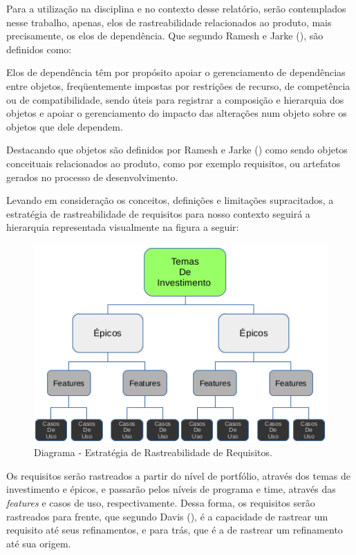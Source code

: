     Para a utilização na disciplina e no contexto desse relatório, 
    serão contemplados nesse trabalho, apenas, elos de rastreabilidade relacionados ao produto, 
    mais precisamente, os elos de dependência. Que segundo Ramesh e Jarke (\citeyear{ramesh01}), são definidos como:

    \begin{citacao}
      Elos de dependência têm por propósito apoiar o gerenciamento de dependências entre objetos, 
      freqüentemente impostas por restrições de recurso, de competência ou de compatibilidade, 
      sendo úteis para registrar a composição e hierarquia dos objetos e apoiar o gerenciamento do impacto das 
      alterações num objeto sobre os objetos que dele dependem. \cite{ramesh01}
    \end{citacao}
  
    Destacando que objetos são definidos por Ramesh e Jarke (\citeyear{ramesh01}) como sendo objetos conceituais 
    relacionados ao produto, como por exemplo requisitos, ou artefatos gerados no processo de desenvolvimento.

    Levando em consideração os  conceitos, definições e limitações supracitados, a estratégia de rastreabilidade de 
    requisitos para nosso contexto seguirá a hierarquia representada visualmente na figura a seguir:
  
    \begin{figure}[!htbp]
      \centering
      \includegraphics[scale=0.7]{editaveis/figuras/traceability}
      \caption[Diagrama - Estratégia de Rastreabilidade de Requisitos.] {Diagrama - Estratégia de Rastreabilidade de Requisitos. \footnotemark}
      \label{traceability}
    \end{figure}
 
    Os requisitos serão rastreados a partir do nível de portfólio, 
    através dos temas de investimento e épicos, e passarão pelos níveis de programa e time, 
    através das \textit{features} e casos de uso, respectivamente. Dessa forma, os requisitos serão rastreados para frente, 
    que segundo Davis (\citeyear{davis93}), é a capacidade de rastrear um requisito até seus refinamentos, 
    e para trás, que é a de rastrear um refinamento até sua origem.
  
